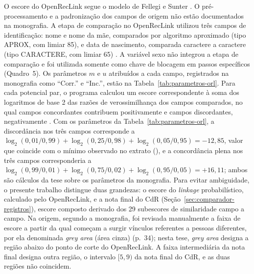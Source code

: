 O escore do OpenRecLink segue o modelo de Fellegi e Sunter \citeyearpar{Fellegi1969theory}. O pré-processamento e a padronização dos campos de origem não estão documentados na monografia. A etapa de comparação no OpenRecLink utilizou três campos de identificação: nome e nome da mãe, comparados por algoritmo aproximado (tipo APROX, com limiar 85), e data de nascimento, comparada caractere a caractere (tipo CARACTERE, com limiar 65) \cite[p.~34]{Oliveira2026obitoTBpulmonar}. A variável sexo não integrou a etapa de comparação e foi utilizada somente como chave de blocagem em passos específicos (Quadro~5). Os parâmetros $m$ e $u$ atribuídos a cada campo, registrados na monografia como ``Corr.'' e ``Inc.'', estão na Tabela~\ref{tab:parametros-orl}. Para cada potencial par, o programa calculou um escore correspondente à soma dos logaritmos de base 2 das razões de verossimilhança dos campos comparados, no qual campos concordantes contribuem positivamente e campos discordantes, negativamente \cite{Fellegi1969theory, Christen2012book}. Com os parâmetros da Tabela~\ref{tab:parametros-orl}, a discordância nos três campos corresponde a $\log_2(0{,}01/0{,}99)+\log_2(0{,}25/0{,}98)+\log_2(0{,}05/0{,}95)=-12{,}85$, valor que coincide com o mínimo observado no extrato (), e a concordância plena nos três campos corresponderia a $\log_2(0{,}99/0{,}01)+\log_2(0{,}75/0{,}02)+\log_2(0{,}95/0{,}05)=+16{,}11$; ambos são cálculos da tese sobre os parâmetros da monografia. Para evitar ambiguidade, o presente trabalho distingue duas grandezas: o escore do \textit{linkage} probabilístico, calculado pelo OpenRecLink, e a nota final do CdR (Seção~\ref{sec:comparador-registros}), escore composto derivado dos 29 subescores de similaridade campo a campo. Na origem, segundo a monografia, foi revisada manualmente a faixa de escore a partir da qual começam a surgir vínculos referentes a pessoas diferentes, por ela denominada \textit{grey area} (área cinza) (p.~34); nesta tese, \textit{grey area} designa a região abaixo do ponto de corte do OpenRecLink. A faixa intermediária da nota final designa outra região, o intervalo $[5,9)$ da nota final do CdR, e as duas regiões não coincidem.

